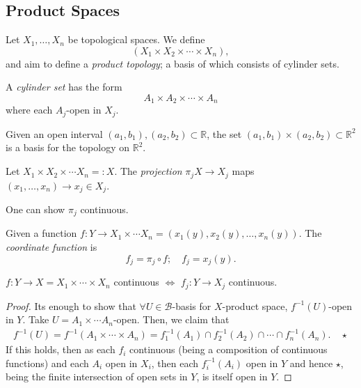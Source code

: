 \subsection{Product Spaces}

\begin{definition}
    Let $X_1, \dots, X_n$ be topological spaces. We define \[
    (X_1 \times X_2 \times \cdots \times X_n),    
    \]
    and aim to define a \emph{product topology}; a basis of which consists of cylinder sets.
\end{definition}

\begin{definition}
    A \emph{cylinder set} has the form $$A_1 \times A_2 \times \cdots \times A_n$$ where each $A_j$-open in $X_j$.
\end{definition}

\begin{example}
    Given an open interval $(a_1, b_1), (a_2, b_2) \subset \mathbb{R}$, the set $(a_1, b_1) \times (a_2, b_2) \subset \mathbb{R}^2$ is a basis for the topology on $\mathbb{R}^2$.
\end{example}

\begin{definition}[Projection]
    Let $X_1 \times X_2 \times \cdots X_n =: X$. The \emph{projection} $\pi_j X \to X_j$ maps $(x_1, \dots, x_n) \to x_j \in X_j$.
\end{definition}

\begin{remark}
    One can show $\pi_j$ continuous.
\end{remark}

\begin{definition}
    Given a function $f: Y \to X_1 \times \cdots X_n = (x_1(y), x_2(y), \dots, x_n(y))$. The \emph{coordinate function} is $$f_j = \pi_j \circ f;\quad  f_j = x_j(y).$$
\end{definition}

\begin{proposition}\label{prop:finitecontinuousproducspace}
    $f: Y \to X = X_1 \times \cdots \times X_n$ continuous $\iff$ $f_j : Y \to X_j$ continuous.
\end{proposition}

\begin{proof}
    Its enough to show that $\forall U \in \mathcal{B}$-basis for $X$-product space, $f^{-1}(U)$-open in $Y$. Take $U = A_1 \times \cdots A_n$-open. Then, we claim that \begin{align*}
        f^{-1}(U) = f^{-1}(A_1 \times \cdots \times A_n) = f_1^{-1}(A_1) \cap f_2^{-1}(A_2)\cap \cdots \cap f_n^{-1}(A_n). \quad \star
    \end{align*}
    If this holds, then as each $f_i$ continuous (being a composition of continuous functions) and each $A_i$ open in $X_i$, then each $f_i^{-1}(A_i)$ open in $Y$ and hence $\star$, being the finite intersection of open sets in $Y$, is itself open in $Y$.

\end{proof}


